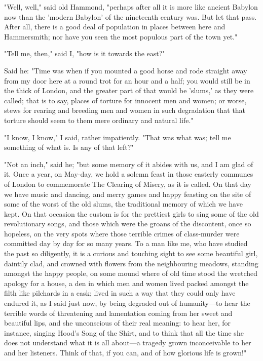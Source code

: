 "Well, well," said old Hammond, "perhaps after all it is more like
ancient Babylon now than the 'modern Babylon' of the nineteenth century
was. But let that pass. After all, there is a good deal of population in
places between here and Hammersmith; nor have you seen the most populous
part of the town yet."

"Tell me, then," said I, "how is it towards the east?"

Said he: "Time was when if you mounted a good horse and rode straight
away from my door here at a round trot for an hour and a half; you would
still be in the thick of London, and the greater part of that would be
'slums,' as they were called; that is to say, places of torture for
innocent men and women; or worse, stews for rearing and breeding men and
women in such degradation that that torture should seem to them mere
ordinary and natural life."

"I know, I know," I said, rather impatiently. "That was what was; tell
me something of what is. Is any of that left?"

"Not an inch," said he; "but some memory of it abides with us, and I am
glad of it. Once a year, on May-day, we hold a solemn feast in those
easterly communes of London to commemorate The Clearing of Misery, as it
is called. On that day we have music and dancing, and merry games and
happy feasting on the site of some of the worst of the old slums, the
traditional memory of which we have kept. On that occasion the custom is
for the prettiest girls to sing some of the old revolutionary songs, and
those which were the groans of the discontent, once so hopeless, on the
very spots where those terrible crimes of class-murder were committed
day by day for so many years. To a man like me, who have studied the
past so diligently, it is a curious and touching sight to see some
beautiful girl, daintily clad, and crowned with flowers from the
neighbouring meadows, standing amongst the happy people, on some mound
where of old time stood the wretched apology for a house, a den in which
men and women lived packed amongst the filth like pilchards in a cask;
lived in such a way that they could only have endured it, as I said just
now, by being degraded out of humanity---to hear the terrible words of
threatening and lamentation coming from her sweet and beautiful lips,
and she unconscious of their real meaning: to hear her, for instance,
singing Hood's Song of the Shirt, and to think that all the time she
does not understand what it is all about---a tragedy grown inconceivable
to her and her listeners. Think of that, if you can, and of how glorious
life is grown!"

